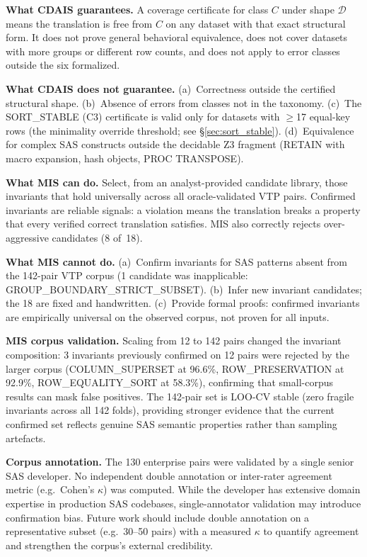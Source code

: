 \documentclass[conference]{IEEEtran}
\begin{document}
\textbf{What CDAIS guarantees.} A coverage certificate for class $C$ under shape
$\mathcal{D}$ means the translation is free from $C$ on any dataset with that exact
structural form. It does not prove general behavioral equivalence, does not cover
datasets with more groups or different row counts, and does not apply to error classes
outside the six formalized.

\textbf{What CDAIS does not guarantee.} (a)~Correctness outside the certified
structural shape. (b)~Absence of errors from classes not in the taxonomy.
(c)~The SORT\_STABLE (C3) certificate is valid only for datasets with $\geq$17
equal-key rows (the minimality override threshold; see \S\ref{sec:sort_stable}).
(d)~Equivalence for complex SAS constructs outside the decidable Z3 fragment
(RETAIN with macro expansion, hash objects, PROC TRANSPOSE).

\textbf{What MIS can do.} Select, from an analyst-provided candidate library, those
invariants that hold universally across all oracle-validated VTP pairs. Confirmed
invariants are reliable signals: a violation means the translation breaks a property
that every verified correct translation satisfies. MIS also correctly rejects
over-aggressive candidates (8 of~18).

\textbf{What MIS cannot do.} (a)~Confirm invariants for SAS patterns absent from the
142-pair VTP corpus (1 candidate was inapplicable: GROUP\_BOUNDARY\_STRICT\_SUBSET).
(b)~Infer new invariant candidates; the 18 are fixed and handwritten.
(c)~Provide formal proofs: confirmed invariants are empirically universal on the
observed corpus, not proven for all inputs.

\textbf{MIS corpus validation.} Scaling from 12 to 142 pairs changed the invariant
composition: 3 invariants previously confirmed on 12 pairs were rejected by the
larger corpus (COLUMN\_SUPERSET at 96.6\%, ROW\_PRESERVATION at 92.9\%,
ROW\_EQUALITY\_SORT at 58.3\%), confirming that small-corpus results can mask false
positives. The 142-pair set is LOO-CV stable (zero fragile invariants across all
142 folds), providing stronger evidence that the current confirmed set reflects
genuine SAS semantic properties rather than sampling artefacts.

\textbf{Corpus annotation.} The 130 enterprise pairs were validated by a single
senior SAS developer. No independent double annotation or inter-rater agreement
metric (e.g.\ Cohen's $\kappa$) was computed. While the developer has extensive
domain expertise in production SAS codebases, single-annotator validation may
introduce confirmation bias. Future work should include double annotation on a
representative subset (e.g.\ 30--50 pairs) with a measured $\kappa$ to quantify
agreement and strengthen the corpus's external credibility.
\end{document}
